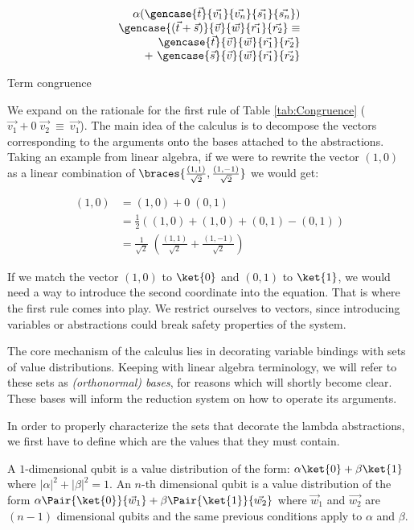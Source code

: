 \begin{table*}[tb]
\[\begin{array}{c c}
      \multicolumn{2}{r}{\alpha(\gencase{\vec{t}}{\vec{v_1}}{\vec{v_n}}{\vec{s_1}}{\vec{s_n}})}\\
      \multicolumn{2}{l}{\gencase{(\vec{t}+\vec{s})}{\vec{v}}{\vec{w}}{\vec{r_1}}{\vec{r_2}}\equiv}\\
      \multicolumn{2}{r}{\gencase{\vec{t}}{\vec{v}}{\vec{w}}{\vec{r_1}}{\vec{r_2}}}\\
      \multicolumn{2}{r}{+~\gencase{\vec{s}}{\vec{v}}{\vec{w}}{\vec{r_1}}{\vec{r_2}}}
    \end{array}
  \]
  \caption{Term congruence}
  \label{tab:Congruence}
\end{table*}


We expand on the rationale for the first rule of Table \ref{tab:Congruence} ($\vec{v_1} + 0\; \vec{v_2}~\equiv~\vec{v_1}$). The main idea of the calculus is to decompose the vectors corresponding to the arguments onto the bases attached to the abstractions. Taking an example from linear algebra, if we were to rewrite the vector $(1,0)$ as a linear combination of $\braces{\frac{(1,1)}{\sqrt{2}}, \frac{(1,-1)}{\sqrt{2}}}$ we would get:

\begin{align*}
  (1,0) &= (1,0) + 0 \; (0,1) \\
  &=\frac{1}{2} ((1,0) + (1,0) + (0,1) - (0,1))\\
  &=\frac{1}{\sqrt{2}}\;\left(\frac{(1,1)}{\sqrt{2}} + \frac{(1,-1)}{\sqrt{2}}\right)  
\end{align*}

If we match the vector $(1,0)$ to $\ket{0}$ and $(0,1)$ to $\ket{1}$, we would need a way to introduce the second coordinate into the equation. That is where the first rule comes into play. We restrict ourselves to vectors, since introducing variables or abstractions could break safety properties of the system.

The core mechanism of the calculus lies in decorating variable bindings with sets of value distributions. Keeping with linear algebra terminology, we will refer to these sets as \textit{(orthonormal) bases}, for reasons which will shortly become clear. These bases will inform the reduction system on how to operate its arguments. 

In order to properly characterize the sets that decorate the lambda abstractions, we first have to define which are the values that they must contain.
\begin{definition}
  A $1$-dimensional qubit is a value distribution of the form: $\alpha \ket{0} + \beta \ket{1}$ where $|\alpha|^2 + |\beta|^2 = 1$. An $n$-th dimensional qubit is a value distribution of the form $\alpha\Pair{\ket{0}}{\vec w_1} + \beta\Pair{\ket{1}}{\vec{w_2}} $ where $\vec w_1$ and $\vec{w_2}$ are $(n-1)$ dimensional qubits and the same previous conditions apply to $\alpha$ and $\beta$.
\end{definition}

